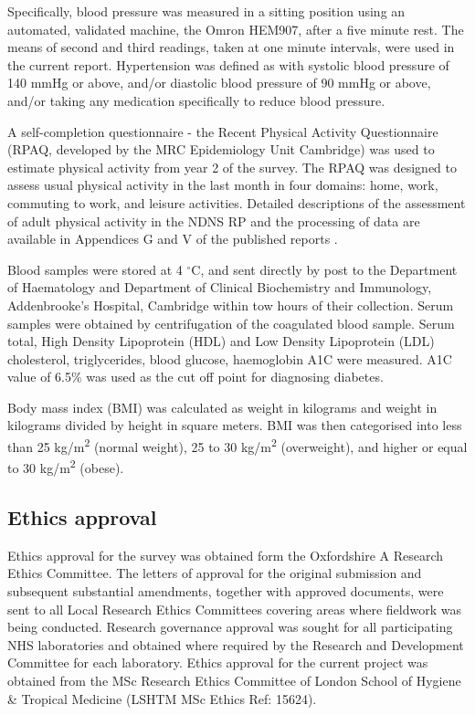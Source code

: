 Specifically, blood pressure was measured in a sitting position using an automated, validated machine, the Omron HEM907, after a five minute rest. The means of second and third readings, taken at one minute intervals, were used in the current report. Hypertension was defined as with systolic blood pressure of 140 mmHg or above, and/or diastolic blood pressure of 90 mmHg or above, and/or taking any medication specifically to reduce blood pressure. 

A self-completion questionnaire - the Recent Physical Activity Questionnaire  \parencite{besson2009estimating} (RPAQ, developed by the MRC Epidemiology Unit Cambridge) was used to estimate physical activity from year 2 of the survey. The RPAQ was designed to assess usual physical activity in the last month in four domains: home, work, commuting to work, and leisure activities. Detailed descriptions of the assessment of adult physical activity in the NDNS RP and the processing of data are available in Appendices G and V of the published reports \parencite{bates2014national,roberts2018national,NDNSofficial}. 

Blood samples were stored at 4 $^\circ$C, and sent directly by post to the Department of Haematology and Department of Clinical Biochemistry and Immunology, Addenbrooke's Hospital, Cambridge within tow hours of their collection. Serum samples were obtained by centrifugation of the coagulated blood sample. Serum total, High Density Lipoprotein (HDL) and Low Density Lipoprotein (LDL) cholesterol, triglycerides, blood glucose, haemoglobin A1C were measured. A1C value of 6.5\% was used as the cut off point for diagnosing diabetes.

Body mass index (BMI) was calculated as weight in kilograms and weight in kilograms divided by height in square meters. BMI was then categorised into less than 25 kg/m\textsuperscript{2} (normal weight), 25 to 30 kg/m\textsuperscript{2} (overweight), and higher or equal to 30 kg/m\textsuperscript{2} (obese). 

\subsection{Ethics approval}\vspace{-0.3cm}

Ethics approval for the survey was obtained form the Oxfordshire A Research Ethics Committee. The letters of approval for the original submission and subsequent substantial amendments, together with approved documents, were sent to all Local Research Ethics Committees covering areas where fieldwork was being conducted. Research governance approval was sought for all participating NHS laboratories and obtained where required by the Research and Development Committee for each laboratory. Ethics approval for the current project was obtained from the MSc Research Ethics Committee of London School of Hygiene \& Tropical Medicine (LSHTM MSc Ethics Ref: 15624). 


